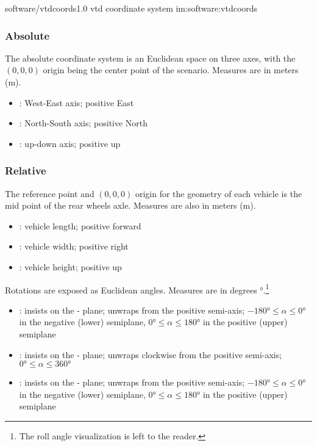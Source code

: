 \begin{image}
	{software/vtdcoords}{1.0}
	{\gls{vtd} coordinate system}
	{im:software:vtdcoords}
	{}
\end{image}

\subsubsection{Absolute}

The absolute coordinate system is an Euclidean space on three axes, with the $(0,0,0)$ origin being the center point of the scenario. Measures are in meters (\si{\meter}).

\begin{itemize}
	\item {}: West-East axis; positive East
	\item {}: North-South axis; positive North
	\item {}: up-down axis; positive up
\end{itemize}

\subsubsection{Relative}

The reference point and $(0,0,0)$ origin for the geometry of each vehicle is the mid point of the rear wheels axle. Measures are also in meters (\si{\meter}).

\begin{itemize}
	\item {}: vehicle length; positive forward
	\item {}: vehicle width; positive right
	\item {}: vehicle height; positive up
\end{itemize}

Rotations are exposed as Euclidean angles. Measures are in degrees \si{\degree}.\footnote{The roll angle visualization is left to the reader.}

\begin{itemize}
	\item {}: insists on the - plane; unwraps from the positive  semi-axis; $\ang{-180} \leqslant \alpha \leqslant \ang{0}$ in the negative (lower) semiplane, $\ang{0} \leqslant \alpha \leqslant \ang{180}$ in the positive (upper) semiplane
	\item {}: insists on the - plane; unwraps clockwise from the positive  semi-axis; $\ang{0} \leqslant \alpha \leqslant \ang{360}$
	\item {}: insists on the - plane; unwraps from the positive  semi-axis; $\ang{-180} \leqslant \alpha \leqslant \ang{0}$ in the negative (lower) semiplane, $\ang{0} \leqslant \alpha \leqslant \ang{180}$ in the positive (upper) semiplane
\end{itemize}

